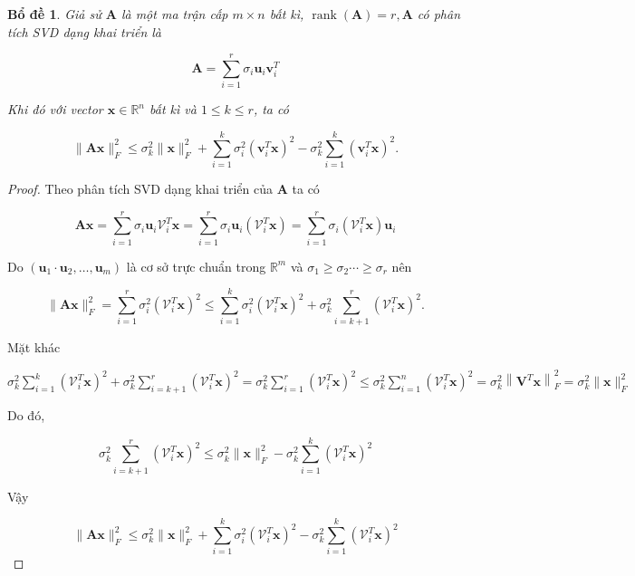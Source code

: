 \documentclass[12pt,a4paper,oneside]{report}
\newtheorem{bd}{Bổ đề} [section]
\numberwithin{equation}{section}
\begin{document}
\begin{bd} \label{bode} Giả sử $\mathbf{A}$ là một ma trận cấp $m \times n$ bất kì, $\operatorname{rank}(\mathbf{A})=r, \mathbf{A}$ có phân tích SVD dạng khai triển là

$$
\mathbf{A}=\sum_{i=1}^{r} \sigma_{i} \mathbf{u}_{i} \mathbf{v}_{i}^{T}
$$

Khi đó với vector $\mathbf{x} \in \mathbb{R}^{n}$ bất kì và $1 \leqslant k \leqslant r$, ta có

$$
\|\mathbf{A} \mathbf{x}\|_{F}^{2} \leqslant \sigma_{k}^{2}\|\mathbf{x}\|_{F}^{2}+\sum_{i=1}^{k} \sigma_{i}^{2}\left(\mathbf{v}_{i}^{T} \mathbf{x}\right)^{2}-\sigma_{k}^{2} \sum_{i=1}^{k}\left(\mathbf{v}_{i}^{T} \mathbf{x}\right)^{2} .
$$
\end{bd}
\begin{proof}
Theo phân tích SVD dạng khai triển của $\mathbf{A}$ ta có

$$
\mathbf{A} \mathbf{x}=\sum_{i=1}^{r} \sigma_{i} \mathbf{u}_{i} \mathcal{V}_{i}^{T} \mathbf{x}=\sum_{i=1}^{r} \sigma_{i} \mathbf{u}_{i}\left(\mathcal{V}_{i}^{T} \mathbf{x}\right)=\sum_{i=1}^{r} \sigma_{i}\left(\mathcal{V}_{i}^{T} \mathbf{x}\right) \mathbf{u}_{i}
$$

Do $\left(\mathbf{u}_{1} \cdot \mathbf{u}_{2}, \ldots, \mathbf{u}_{m}\right)$ là cơ sở trực chuẩn trong $\mathbb{R}^{m}$ và $\sigma_{1} \geqslant \sigma_{2} \cdots \geqslant \sigma_{r}$ nên

$$
\|\mathbf{A} \mathbf{x}\|_{F}^{2}=\sum_{i=1}^{r} \sigma_{i}^{2}\left(\mathcal{V}_{i}^{T} \mathbf{x}\right)^{2} \leqslant \sum_{i=1}^{k} \sigma_{i}^{2}\left(\mathcal{V}_{i}^{T} \mathbf{x}\right)^{2}+\sigma_{k}^{2} \sum_{i=k+1}^{r}\left(\mathcal{V}_{i}^{T} \mathbf{x}\right)^{2} .
$$

Mặt khác

$\sigma_{k}^{2} \sum_{i=1}^{k}\left(\mathcal{V}_{i}^{T} \mathbf{x}\right)^{2}+\sigma_{k}^{2} \sum_{i=k+1}^{r}\left(\mathcal{V}_{i}^{T} \mathbf{x}\right)^{2}=\sigma_{k}^{2} \sum_{i=1}^{r}\left(\mathcal{V}_{i}^{T} \mathbf{x}\right)^{2} \leqslant \sigma_{k}^{2} \sum_{i=1}^{n}\left(\mathcal{V}_{i}^{T} \mathbf{x}\right)^{2}=\sigma_{k}^{2}\left\|\mathbf{V}^{T} \mathbf{x}\right\|_{F}^{2}=\sigma_{k}^{2}\|\mathbf{x}\|_{F}^{2}$

Do đó,

$$
\sigma_{k}^{2} \sum_{i=k+1}^{r}\left(\mathcal{V}_{i}^{T} \mathbf{x}\right)^{2} \leqslant \sigma_{k}^{2}\|\mathbf{x}\|_{F}^{2}-\sigma_{k}^{2} \sum_{i=1}^{k}\left(\mathcal{V}_{i}^{T} \mathbf{x}\right)^{2}
$$

Vậy

$$
\|\mathbf{A} \mathbf{x}\|_{F}^{2} \leqslant \sigma_{k}^{2}\|\mathbf{x}\|_{F}^{2}+\sum_{i=1}^{k} \sigma_{i}^{2}\left(\mathcal{V}_{i}^{T} \mathbf{x}\right)^{2}-\sigma_{k}^{2} \sum_{i=1}^{k}\left(\mathcal{V}_{i}^{T} \mathbf{x}\right)^{2}
$$
\end{proof}
\end{document}
